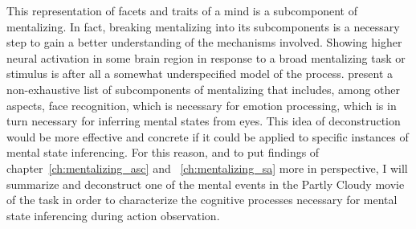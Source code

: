 This representation of facets and traits of a mind is a subcomponent of mentalizing. In fact, breaking mentalizing into its subcomponents \citep["deconstructing" it][]{schaafsma2015} is a necessary step to gain a better understanding of the mechanisms involved. Showing higher neural activation in some brain region in response to a broad mentalizing task or stimulus is after all a somewhat underspecified model of the process. \cite{schaafsma2015} present a non-exhaustive list of subcomponents of mentalizing that includes, among other aspects, face recognition, which is necessary for emotion processing, which is in turn necessary for inferring mental states from eyes. This idea of deconstruction would be more effective and concrete if it could be applied to specific instances of mental state inferencing. For this reason, and to put findings of chapter~\ref{ch:mentalizing_asc} and ~\ref{ch:mentalizing_sa} more in perspective, I will summarize and deconstruct one of the mental events in the Partly Cloudy movie of the task in order to characterize the cognitive processes necessary for mental state inferencing during action observation.  

